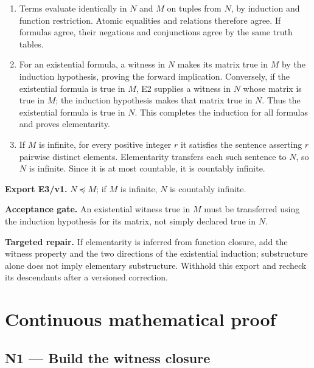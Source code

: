 \documentclass[preprint,12pt,aps,pra,showkeys,amsmath,amssymb,superscriptaddress,floatfix]{revtex4-2}
\theoremstyle{definition}
\theoremstyle{remark}
\newcommand{\field}[2]{\par\smallskip\noindent\textbf{#1.} #2\par}
\begin{document}
\begin{enumerate}[label=N3.\arabic*,leftmargin=3.4em]

\item Terms evaluate identically in \(N\) and \(M\) on tuples from \(N\), by
induction and function restriction. Atomic equalities and relations
therefore agree. If formulas agree, their negations and conjunctions
agree by the same truth tables.

\item For an existential formula, a witness in \(N\) makes its matrix true in
\(M\) by the induction hypothesis, proving the forward implication.
Conversely, if the existential formula is true in \(M\), E2 supplies a
witness in \(N\) whose matrix is true in \(M\); the induction hypothesis
makes that matrix true in \(N\). Thus the existential formula is true in
\(N\). This completes the induction for all formulas and proves
elementarity.

\item If \(M\) is infinite, for every positive integer \(r\) it satisfies the
sentence asserting \(r\) pairwise distinct elements. Elementarity
transfers each such sentence to \(N\), so \(N\) is infinite. Since it is
at most countable, it is countably infinite.

\end{enumerate}

\field{Export E3/v1}{\(N\preccurlyeq M\); if \(M\) is infinite, \(N\) is countably infinite.}

\field{Acceptance gate}{An existential witness true in \(M\) must be transferred using the
induction hypothesis for its matrix, not simply declared true in \(N\).}

\field{Targeted repair}{If elementarity is inferred from function closure, add the witness
property and the two directions of the existential induction;
substructure alone does not imply elementary substructure. Withhold this
export and recheck its descendants after a versioned correction.}

\endgroup

\endgroup\clearpage\section{Continuous mathematical proof}\label{sec:proof}

\subsection{N1 --- Build the witness
closure}\label{n1-build-the-witness-closure}
\end{document}
